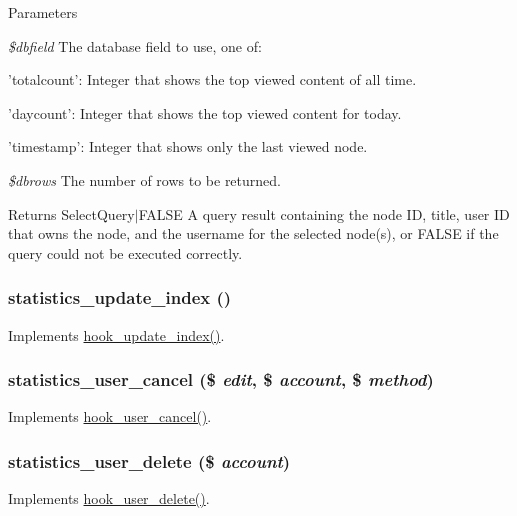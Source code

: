 \begin{DoxyParams}{Parameters}
\item[{\em \$dbfield}]The database field to use, one of:
\begin{DoxyItemize}
\item 'totalcount': Integer that shows the top viewed content of all time.
\item 'daycount': Integer that shows the top viewed content for today.
\item 'timestamp': Integer that shows only the last viewed node. 
\end{DoxyItemize}\item[{\em \$dbrows}]The number of rows to be returned.\end{DoxyParams}
\begin{DoxyReturn}{Returns}
SelectQuery$|$FALSE A query result containing the node ID, title, user ID that owns the node, and the username for the selected node(s), or FALSE if the query could not be executed correctly. 
\end{DoxyReturn}
\hypertarget{statistics_8module_a2d7056d1f9f2be0964a02112f50e1a33}{
\subsubsection[{statistics\_\-update\_\-index}]{\setlength{\rightskip}{0pt plus 5cm}statistics\_\-update\_\-index ()}}
\label{statistics_8module_a2d7056d1f9f2be0964a02112f50e1a33}
Implements \hyperlink{group__search_ga23d6f6642bd53c4f033f10e9c1b12d43}{hook\_\-update\_\-index()}. \hypertarget{statistics_8module_a349d206ce12f9119bba057360741867d}{
\subsubsection[{statistics\_\-user\_\-cancel}]{\setlength{\rightskip}{0pt plus 5cm}statistics\_\-user\_\-cancel (\$ {\em edit}, \/  \$ {\em account}, \/  \$ {\em method})}}
\label{statistics_8module_a349d206ce12f9119bba057360741867d}
Implements \hyperlink{group__hooks_gad6223ddd2f0f52c331df8a3315d9a41e}{hook\_\-user\_\-cancel()}. \hypertarget{statistics_8module_a36563f2a6c0c1878b8f8f835536ed3af}{
\subsubsection[{statistics\_\-user\_\-delete}]{\setlength{\rightskip}{0pt plus 5cm}statistics\_\-user\_\-delete (\$ {\em account})}}
\label{statistics_8module_a36563f2a6c0c1878b8f8f835536ed3af}
Implements \hyperlink{group__hooks_ga2c0755857e486e8a770b44b496da9929}{hook\_\-user\_\-delete()}. 
